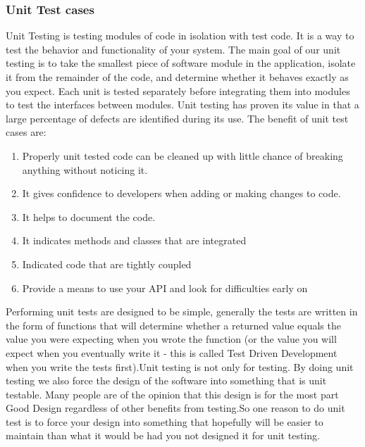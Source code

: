 \documentclass[article,type=msc,colorback,accentcolor=tud9c,twoside,11pt]{tudthesis}
\begin{document}
\subsubsection{Unit Test cases}
Unit Testing\cite{EffectivnessofUnitTest} is testing modules of code in isolation with test code. It is a way to test the behavior and functionality of your system. The main goal of our unit testing is to take the smallest piece of software module in the application, isolate it from the remainder of the code, and determine whether it behaves exactly as you expect. Each unit is tested separately before integrating them into modules to test the interfaces between modules. Unit testing has proven its value in that a large percentage of defects are identified during its use. The benefit of unit test cases are:
\begin{enumerate}
\item Properly unit tested code can be cleaned up with little chance of breaking anything without noticing it.
\item It gives confidence to developers when adding or making changes to code.
\item It helps to document the code.
\item It indicates methods and classes that are integrated 
\item Indicated code that are tightly coupled
\item Provide a means to use your API and look for difficulties early on 
\end{enumerate}
Performing unit tests are designed to be simple, generally the tests are written in the form of functions that will determine whether a returned value equals the value you were expecting when you wrote the function (or the value you will expect when you eventually write it - this is called Test Driven Development when you write the tests first).Unit testing is not only for testing. By doing unit testing we also force the design of the software into something that is unit testable. Many people are of the opinion that this design is for the most part Good Design regardless of other benefits from testing.So one reason to do unit test is to force your design into something that hopefully will be easier to maintain than what it would be had you not designed it for unit testing.
\end{document}
